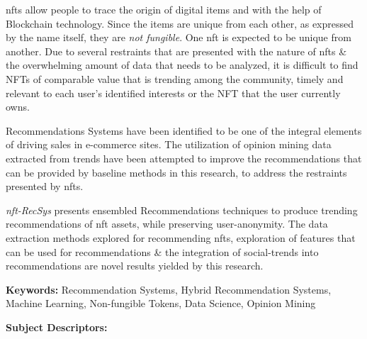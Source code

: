 
\gls{nft}s allow people to trace the origin of digital items and with the help of Blockchain technology. Since the items are unique from each other, as expressed by the name itself, they are \textit{not fungible}. One \gls{nft} is expected to be unique from another. 
Due to several restraints that are presented with the nature of \gls{nft}s \& the overwhelming amount of data that needs to be analyzed, it is difficult to find NFTs of comparable value that is trending among the community, timely and relevant to each user’s identified interests or the NFT that the user currently owns.

Recommendations Systems have been identified to be one of the integral elements of driving sales in e-commerce sites. The utilization of opinion mining data extracted from trends have been attempted to improve the recommendations that can be provided by baseline methods in this research, to address the restraints presented by \gls{nft}s.

\textit{\gls{nft}-RecSys} presents ensembled Recommendations techniques to produce trending recommendations of \gls{nft} assets, while preserving user-anonymity. The data extraction methods explored for recommending \gls{nft}s, exploration of features that can be used for recommendations \& the integration of social-trends into recommendations are novel results yielded by this research.

\bigbreak
\noindent\textbf{Keywords:} Recommendation Systems, Hybrid Recommendation Systems, Machine Learning, Non-fungible Tokens, Data Science, Opinion Mining

\bigbreak
\noindent\textbf{Subject Descriptors:}

